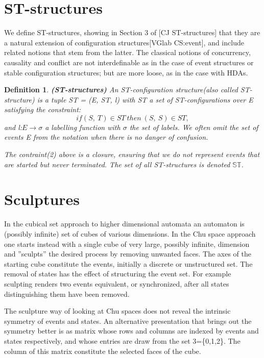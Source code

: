 \documentclass[submission,copyright,creativecommons]{eptcs}
\newtheorem{definition}[theorem]{Definition}
\begin{document}
\section{ST-structures}
	We define ST-structures, showing in Section 3 of [CJ ST-structures] that they are a natural extension of configuration structures[VGlab CS:event], and include related notions that stem from the latter. The classical notions of concurrency, causality and conflict are not interdefinable as in the case of event structures or stable configuration structures; but are more loose, as in the case with HDAs.


	\begin{definition}{\textbf{(ST-structures)}}
		An ST-configuration structure(also called ST-structure) is a tuple ST = (E, ST, l) with ST a set of ST-configurations over E satisfying the constraint:
		\begin{equation}
			if(S,\ T) \in ST\ then\ (S,\ S) \in ST,
		\end{equation}
	\noindent and l:$E \rightarrow \sigma$ a labelling function with $\sigma$ the set of labels. We often omit the set of events E from the notation when  there is no danger of confusion.

	The contraint(2) above is a closure, ensuring that we do not represent events that are started but never terminated. The set of all ST-structures is denoted $\mathbb{ST}$. 

	\end{definition}


\section{Sculptures}
	In the cubical set approach to higher dimensional automata an automaton is (possibly infinite) set of cubes of various dimensions. In the Chu space approach one starts instead with a single cube of very large, possibly infinite, dimension and ''sculpts'' the desired process by removing unwanted faces. The axes of the starting cube constitute the events, initially a discrete or unstructured set. The removal of states has the effect of structuring the event set. For example sculpting renders two events equivalent, or synchronized, after all states distinguishing them have been removed.

	The sculpture way of looking at Chu spaces does not reveal the intrinsic symmetry of events and states. An alternative presentation that brings out the symmetry better is as matrix whose rows and columns are indexed by events and states respectively, and whose entries are draw from the set 3=\{0,1,2\}. The column of this matrix constitute the selected faces of the cube.\\
\end{document}
